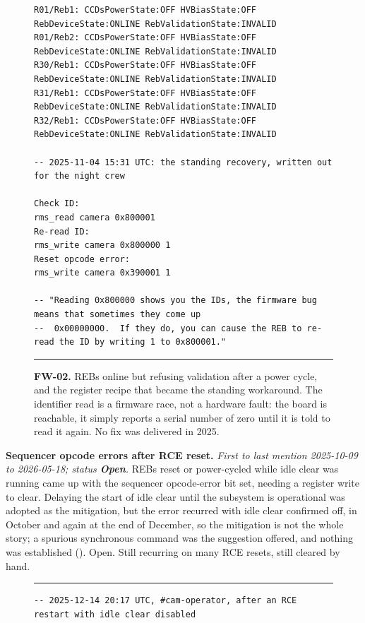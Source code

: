 \begin{description}
\begin{figure}[H]
\begin{minipage}{\textwidth}
\begin{verbatim}
R01/Reb1: CCDsPowerState:OFF HVBiasState:OFF RebDeviceState:ONLINE RebValidationState:INVALID
R01/Reb2: CCDsPowerState:OFF HVBiasState:OFF RebDeviceState:ONLINE RebValidationState:INVALID
R30/Reb1: CCDsPowerState:OFF HVBiasState:OFF RebDeviceState:ONLINE RebValidationState:INVALID
R31/Reb1: CCDsPowerState:OFF HVBiasState:OFF RebDeviceState:ONLINE RebValidationState:INVALID
R32/Reb1: CCDsPowerState:OFF HVBiasState:OFF RebDeviceState:ONLINE RebValidationState:INVALID

-- 2025-11-04 15:31 UTC: the standing recovery, written out for the night crew

Check ID:
rms_read camera 0x800001
Re-read ID:
rms_write camera 0x800000 1
Reset opcode error:
rms_write camera 0x390001 1

-- "Reading 0x800000 shows you the IDs, the firmware bug means that sometimes they come up
--  0x00000000.  If they do, you can cause the REB to re-read the ID by writing 1 to 0x800001."
\end{verbatim}
\endgroup
\vspace{-10pt}\hrule
\end{minipage}
\caption{\textbf{FW-02.} REBs online but refusing validation after a power cycle, and the register recipe that became the standing workaround.  The identifier read is a firmware race, not a hardware fault: the board is reachable, it simply reports a serial number of zero until it is told to read it again.  No fix was delivered in 2025.}
\label{fig:iss-FW-02}
\end{figure}

\item[FW-03]\label{iss:FW-03} \textbf{Sequencer opcode errors after RCE reset.}
  \emph{First to last mention 2025-10-09 to 2026-05-18; status \textcolor{stopn}{\textbf{Open}}.}
  REBs reset or power-cycled while idle clear was running came up with the sequencer opcode-error bit set, needing a register write to clear.  Delaying the start of idle clear until the subsystem is operational was adopted as the mitigation, but the error recurred with idle clear confirmed off, in October and again at the end of December, so the mitigation is not the whole story; a spurious synchronous command was the suggestion offered, and nothing was established ().  Open.  Still recurring on many RCE resets, still cleared by hand.

\begin{figure}[H]
\centering
\begin{minipage}{\textwidth}
\hrule\vspace{4pt}
\begingroup\scriptsize
\begin{verbatim}
-- 2025-12-14 20:17 UTC, #cam-operator, after an RCE restart with idle clear disabled


\end{verbatim}
\end{minipage}
\end{figure}
\end{description}
